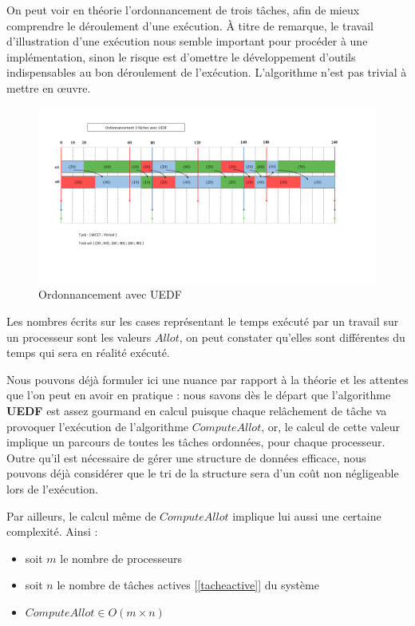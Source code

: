 	On peut voir en théorie l'ordonnancement de trois tâches, afin de mieux comprendre le déroulement d'une exécution.
	À titre de remarque, le travail d'illustration d'une exécution nous semble 
	important pour procéder à une implémentation, sinon le risque est d'omettre le développement 
	d'outils indispensables au bon déroulement de l'exécution. L'algorithme n'est pas trivial à mettre en œuvre.
	\newline

	\begin{figure}[H]
		\label{3tasksuedfoptimal}
		\caption{Ordonnancement avec UEDF}
		\includegraphics[scale=0.6]{img/uedf/croquisuedf3tasks.png}
	\end{figure}

	Les nombres écrits sur les cases représentant le temps exécuté par un travail sur un processeur sont les valeurs 
	$Allot$, on peut constater qu'elles sont différentes du temps qui sera en réalité exécuté.\newline
	
	Nous pouvons déjà formuler ici une nuance par rapport à la théorie et les attentes que l'on peut en avoir 
	en pratique : 
	nous savons dès le départ que l'algorithme \textbf{UEDF} est assez gourmand en calcul puisque chaque relâchement de 
	tâche va provoquer l'exécution de l'algorithme $Compute Allot$, or, le calcul de cette valeur 
	implique un parcours de toutes les tâches ordonnées, pour chaque processeur. 
	Outre qu'il est nécessaire de gérer une structure de données efficace, nous pouvons 
	déjà considérer que le tri de la structure sera d'un coût non négligeable lors de l'exécution. \newline
	
	Par ailleurs, le calcul même de $Compute Allot$ implique lui aussi une certaine complexité.
	Ainsi :
	\begin{itemize}
		\setlength\itemsep{0.1em}
		\item soit $m$ le nombre de processeurs
		\item soit $n$ le nombre de tâches actives [\ref*{tacheactive}] du système
		\item $Compute Allot \in O(m\times n)$
	\end{itemize}

